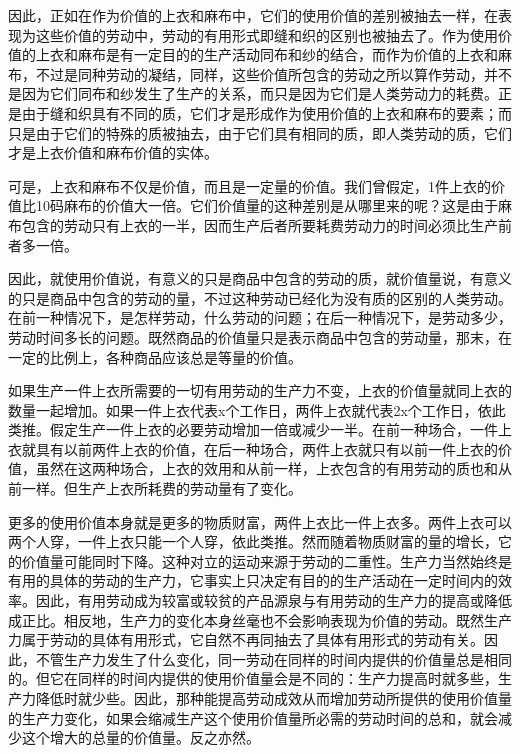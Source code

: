 \documentclass{ctexbook}
\begin{document}
    因此，正如在作为价值的上衣和麻布中，它们的使用价值的差别被抽去一样，在表现为这些价值的劳动中，劳动的有用形式即缝和织的区别也被抽去了。作为使用价值的上衣和麻布是有一定目的的生产活动同布和纱的结合，而作为价值的上衣和麻布，不过是同种劳动的凝结，同样，这些价值所包含的劳动之所以算作劳动，并不是因为它们同布和纱发生了生产的关系，而只是因为它们是人类劳动力的耗费。正是由于缝和织具有不同的质，它们才是形成作为使用价值的上衣和麻布的要素；而只是由于它们的特殊的质被抽去，由于它们具有相同的质，即人类劳动的质，它们才是上衣价值和麻布价值的实体。

    可是，上衣和麻布不仅是价值，而且是一定量的价值。我们曾假定，1件上衣的价值比10码麻布的价值大一倍。它们价值量的这种差别是从哪里来的呢？这是由于麻布包含的劳动只有上衣的一半，因而生产后者所要耗费劳动力的时间必须比生产前者多一倍。

    因此，就使用价值说，有意义的只是商品中包含的劳动的质，就价值量说，有意义的只是商品中包含的劳动的量，不过这种劳动已经化为没有质的区别的人类劳动。在前一种情况下，是怎样劳动，什么劳动的问题；在后一种情况下，是劳动多少，劳动时间多长的问题。既然商品的价值量只是表示商品中包含的劳动量，那末，在一定的比例上，各种商品应该总是等量的价值。

    如果生产一件上衣所需要的一切有用劳动的生产力不变，上衣的价值量就同上衣的数量一起增加。如果一件上衣代表x个工作日，两件上衣就代表2x个工作日，依此类推。假定生产一件上衣的必要劳动增加一倍或减少一半。在前一种场合，一件上衣就具有以前两件上衣的价值，在后一种场合，两件上衣就只有以前一件上衣的价值，虽然在这两种场合，上衣的效用和从前一样，上衣包含的有用劳动的质也和从前一样。但生产上衣所耗费的劳动量有了变化。

    更多的使用价值本身就是更多的物质财富，两件上衣比一件上衣多。两件上衣可以两个人穿，一件上衣只能一个人穿，依此类推。然而随着物质财富的量的增长，它的价值量可能同时下降。这种对立的运动来源于劳动的二重性。生产力当然始终是有用的具体的劳动的生产力，它事实上只决定有目的的生产活动在一定时间内的效率。因此，有用劳动成为较富或较贫的产品源泉与有用劳动的生产力的提高或降低成正比。相反地，生产力的变化本身丝毫也不会影响表现为价值的劳动。既然生产力属于劳动的具体有用形式，它自然不再同抽去了具体有用形式的劳动有关。因此，不管生产力发生了什么变化，同一劳动在同样的时间内提供的价值量总是相同的。但它在同样的时间内提供的使用价值量会是不同的：生产力提高时就多些，生产力降低时就少些。因此，那种能提高劳动成效从而增加劳动所提供的使用价值量的生产力变化，如果会缩减生产这个使用价值量所必需的劳动时间的总和，就会减少这个增大的总量的价值量。反之亦然。
\end{document}
